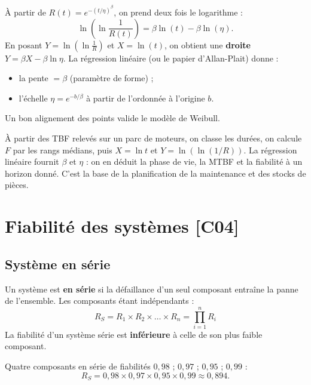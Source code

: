 \documentclass[a4paper,11pt]{article}
\begin{document}
\begin{methode}[-- Linéarisation de Weibull (cas $\gamma = 0$)]
À partir de $R(t) = e^{-(t/\eta)^{\beta}}$, on prend deux fois le logarithme :
\[
\ln\!\left(\ln\frac{1}{R(t)}\right) = \beta \ln(t) - \beta \ln(\eta).
\]
En posant $Y = \ln\!\left(\ln\frac{1}{R}\right)$ et $X = \ln(t)$, on obtient une \textbf{droite} $Y = \beta X - \beta\ln\eta$. La régression linéaire (ou le papier d'Allan-Plait) donne :
\begin{itemize}
  \item la pente $= \beta$ (paramètre de forme) ;
  \item l'échelle $\eta = e^{-b/\beta}$ à partir de l'ordonnée à l'origine $b$.
\end{itemize}
Un bon alignement des points valide le modèle de Weibull.
\end{methode}

\begin{appliindus}
À partir des TBF relevés sur un parc de moteurs, on classe les durées, on calcule $F$ par les rangs médians, puis $X = \ln t$ et $Y = \ln(\ln(1/R))$. La régression linéaire fournit $\beta$ et $\eta$ : on en déduit la phase de vie, la MTBF et la fiabilité à un horizon donné. C'est la base de la planification de la maintenance et des stocks de pièces.
\end{appliindus}

\newpage
\section{Fiabilité des systèmes \hfill {\normalsize\color{uimmred}[C04]}}

\subsection{Système en série}

\begin{theoreme}
Un système est \textbf{en série} si la défaillance d'un seul composant entraîne la panne de l'ensemble. Les composants étant indépendants :
\[
\boxed{R_{S} = R_1 \times R_2 \times \dots \times R_n = \prod_{i=1}^{n} R_i}
\]
La fiabilité d'un système série est \textbf{inférieure} à celle de son plus faible composant.
\end{theoreme}

\begin{exemple}
Quatre composants en série de fiabilités $0{,}98$ ; $0{,}97$ ; $0{,}95$ ; $0{,}99$ :
\[
R_S = 0{,}98 \times 0{,}97 \times 0{,}95 \times 0{,}99 \approx 0{,}894.
\]
\end{exemple}
\end{document}
